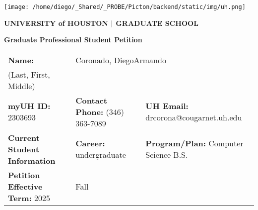 \documentclass[12pt]{article}
\makeatletter
\newcommand{\firstName}{Diego}
\newcommand{\lastName}{Coronado}
\newcommand{\middleName}{Armando}
\newcommand{\studentID}{2303693}
\newcommand{\phoneNumber}{(346) 363-7089}
\newcommand{\emailAddress}{drcorona@cougarnet.uh.edu}
\newcommand{\programPlan}{Computer Science B.S.}
\newcommand{\academicCareer}{undergraduate}
\newcommand{\yearValue}{2025}
\newcommand{\seasonValue}{Fall}
\makeatother
\begin{document}
\thispagestyle{empty}

\begin{center}
  \texttt{[image: /home/diego/\_Shared/\_PROBE/Picton/backend/static/img/uh.png]}
  \vspace{1em}
\end{center}

\begin{center}
  \textbf{\huge \color{gray} UNIVERSITY of \color{red} HOUSTON \color{darkgray} | GRADUATE SCHOOL}
\end{center}

\textbf{\LARGE Graduate Professional Student Petition} 
\vspace{1.5em}

\begin{tabular}{|p{}|p{}|p{}|}
\hline
\textbf{Name:} & \multicolumn{2}{l|}{\lastName, \firstName \middleName} \\
\scriptsize (Last, First, Middle) & \multicolumn{2}{l|}{} \\
\hline
\textbf{myUH ID:} \studentID & \textbf{Contact Phone:} \phoneNumber & \textbf{UH Email:} \emailAddress \\
\hline
\textbf{Current Student Information} & \textbf{Career:} \academicCareer & \textbf{Program/Plan:} \programPlan \\
\hline
\textbf{Petition Effective Term:} \yearValue & \multicolumn{2}{l|}{\seasonValue} \\
\hline
\end{tabular}
\vspace{0.5em}
\end{document}
